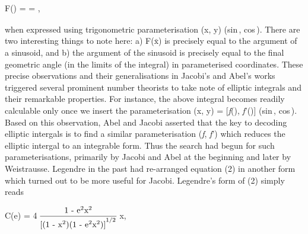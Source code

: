 \documentclass[a4paper,10pt]{article}
\begin{document}
\begin{flushleft}
{{\begin{center}
  \end{center}
  \begin{center}
    F({\upvarphi}) = {{}\textsuperscript{\raisebox{2.5mm}{\upvarphi}}}{\hspace{-3mm}\textsubscript{}}\;{\resizebox{5px}{7px}{\updelta}}{\uptheta} = {\upvarphi},
  \end{center}
  \begin{flushright}
    {\vspace{-8mm}}
  \end{flushright}
  \vspace{2mm}
	when expressed using trigonometric parameterisation (x, y) {\rightarrow} (sin{\,\uptheta}, cos{\,\uptheta}). There are two interesting things to note here: a) F($\bar{\text{x}}$) is precisely equal to the argument {\upvarphi} of a sinusoid, and b) the argument {\upvarphi} of the sinusoid is precisely equal to the final geometric angle (in the limits of the integral) in parameterised coordinates. These precise observations and their generalisations in Jacobi's and Abel's works triggered several prominent number theorists to take note of elliptic integrals and their remarkable properties. For instance, the above integral becomes readily calculable only once we insert the parameterisation (x, y) = [{\large\pala\it{f}}\hspace{0.4mm}(\uptheta), {\large\pala\it{f}}\hspace{0.2mm}'\hspace{-1mm}(\uptheta)] {\rightarrow} (sin{\,\uptheta}, cos{\,\uptheta}). Based on this observation, Abel and Jacobi asserted that the key to decoding elliptic intergals is to find a similar parameterisation ({\large\pala\it{f}}\hspace{0.4mm}, {\large\pala\it{f}}\hspace{0.2mm}') which reduces the elliptic intergal to an integrable form. Thus the search had begun for such parameterisations, primarily by Jacobi and Abel at the beginning and later by Weistrausse. Legendre in the past had re-arranged equation (2) in another form which turned out to be more useful for Jacobi. Legendre's form of (2) simply reads
  \begin{center}
    C(e) = {4\resizebox{7.25px}{5.3px}{\upalpha}}\,{{}\textsuperscript{}}{\hspace{-2.5mm}\textsubscript{}}\;$\displaystyle\frac{\text{1 - e\textsuperscript{2}x\textsuperscript{2}}}{\text{[(1 - x\textsuperscript{2})(\text{1 - e\textsuperscript{2}x\textsuperscript{2}})]\textsuperscript{\textsuperscript{\scriptsize{1/2}}}}}$\,{\resizebox{5px}{7px}{\updelta}}x,

\end{center}}}
\end{flushleft}
\end{document}
